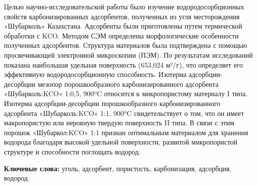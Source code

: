 Целью научно-исследовательской работы было изучение водородосорбционных
свойств карбонизированных адсорбентов, полученных из угля месторождения
«Шубарколь» Казахстана. Адсорбенты были приготовлены путем термической
обработки с KCO. Методом СЭМ
определены морфологические особенности полученных адсорбентов. Структура
материалов была подтверждена с помощью просвечивающей электронной
микроскопии (ПЭМ). По результатам исследований показана наибольшая
удельная поверхность (653,024 м²/г), что определяет его эффективную
водородосорбционную способность. Изотерма адсорбции-десорбции мезопор
порошкообразного карбонизированного адсорбента
«Шубарколь:KCO» 1:0,5, 900ºC относится
к микропористому материалу I типа. Изотерма адсорбции-десорбции
порошкообразного карбонизированного адсорбента
«Шубарколь:KCO» 1:1, 900ºC
свидетельствует о том, что он имеет макропористую или неровную твердую
поверхность II типа. В связи с этим порошок
«Шубаркол:KCO» 1:1 признан оптимальным
материалом для хранения водорода благодаря высокой удельной поверхности,
развитой микропористой структуре и способности поглощать водород.

{\bfseries Ключевые слова:} уголь, адсорбент, пористость, карбонизация,
адсорбция, водород.

